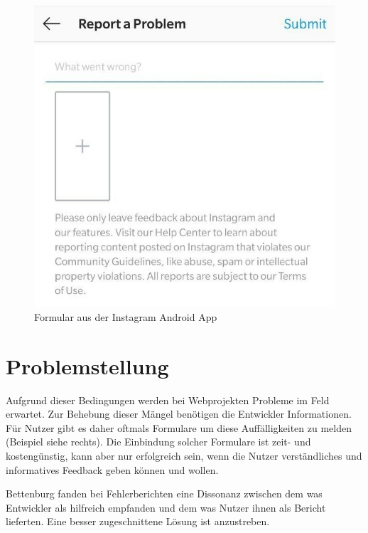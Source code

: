 \begin{figure}
	\centering
	\vspace{-10pt}
	\includegraphics[width=\linewidth]{img/instagram-feedback/instagram-feedback.jpg}
	\caption{Formular aus der Instagram \cite{Instagram} Android App}
	\label{fig:instagram-feedback-example}
\end{figure}

\section{Problemstellung}

Aufgrund dieser Bedingungen werden bei Webprojekten Probleme im Feld erwartet. Zur Behebung dieser Mängel benötigen die Entwickler Informationen. Für Nutzer gibt es daher oftmals Formulare um diese Auffälligkeiten zu melden (Beispiel siehe rechts). Die Einbindung solcher Formulare ist zeit- und kostengünstig, kann aber nur erfolgreich sein, wenn die Nutzer verständliches und informatives Feedback geben können und wollen.

Bettenburg \etal \cite{WhatMakesAGoodBugReport} fanden bei Fehlerberichten eine Dissonanz zwischen dem was Entwickler als hilfreich empfanden und dem was Nutzer ihnen als Bericht lieferten. Eine besser zugeschnittene Lösung ist anzustreben. %

